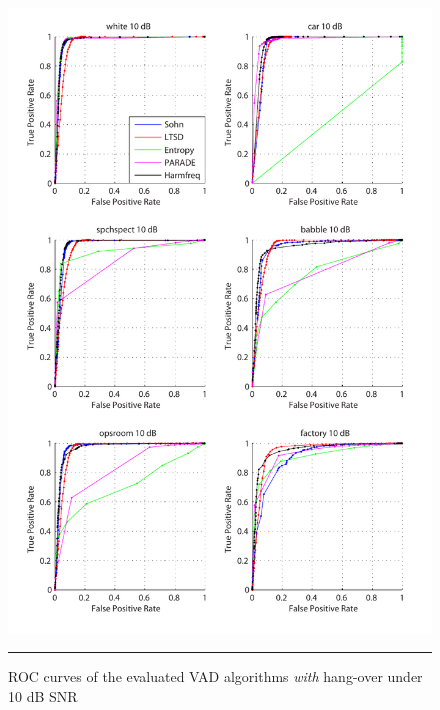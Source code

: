 \begin{figure}[htbp]
	\centering
		\includegraphics[width=1.0\columnwidth]{Figures/AppendixA/10dBh.pdf}
		\rule{37em}{0.5pt}
	\caption[ROC curves of the evaluated algorithms \emph{with} hang-over under 10 dB SNR]{ROC curves of the evaluated VAD algorithms \emph{with} hang-over under 10 dB SNR}
	\label{fig:10dBh}
\end{figure}

